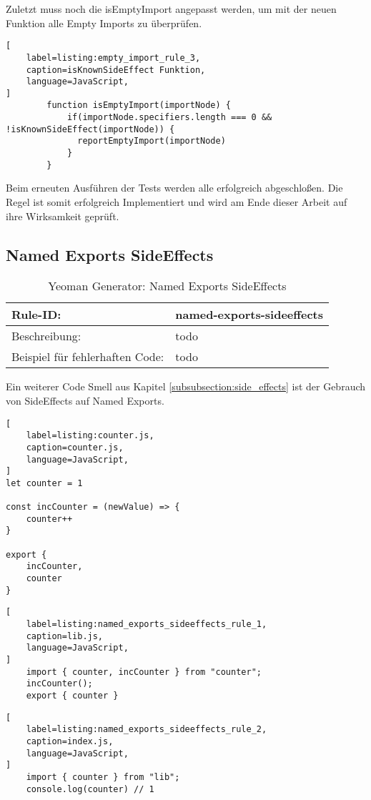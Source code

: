 Zuletzt muss noch die isEmptyImport angepasst werden, um mit der neuen Funktion alle Empty Imports zu überprüfen.

\begin{lstlisting}[
    label=listing:empty_import_rule_3,
	caption=isKnownSideEffect Funktion,
	language=JavaScript,
]
        function isEmptyImport(importNode) {
            if(importNode.specifiers.length === 0 && !isKnownSideEffect(importNode)) {
              reportEmptyImport(importNode)
            }
        }
\end{lstlisting}

Beim erneuten Ausführen der Tests werden alle erfolgreich abgeschloßen. Die Regel ist somit erfolgreich Implementiert und wird am Ende dieser Arbeit auf ihre Wirksamkeit geprüft.

\subsection{Named Exports SideEffects}

\begin{table}[h]
\centering
\caption{Yeoman Generator: Named Exports SideEffects}
\label{tbl:empty_imports}
\begin{tabular}{|l|l|}
\hline
Rule-ID: & named-exports-sideeffects \\ \hline
Beschreibung: & todo \\ \hline
Beispiel für fehlerhaften Code: & todo \\ \hline
\end{tabular}
\end{table}

Ein weiterer Code Smell aus Kapitel \ref{subsubsection:side_effects} ist der Gebrauch von SideEffects auf Named Exports.

\begin{lstlisting}[
    label=listing:counter.js,
	caption=counter.js,
	language=JavaScript,
]
let counter = 1

const incCounter = (newValue) => {
	counter++
}

export {
	incCounter,
	counter
}
\end{lstlisting}

\begin{lstlisting}[
    label=listing:named_exports_sideeffects_rule_1,
	caption=lib.js,
	language=JavaScript,
]
	import { counter, incCounter } from "counter";
	incCounter();
	export { counter }
\end{lstlisting}

\begin{lstlisting}[
    label=listing:named_exports_sideeffects_rule_2,
	caption=index.js,
	language=JavaScript,
]
	import { counter } from "lib";
	console.log(counter) // 1
\end{lstlisting}

